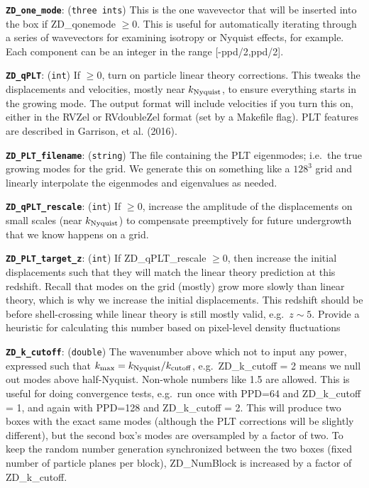 \documentclass[11pt,preprint]{aastex}
\newcommand{\param}[2]{\medskip\noindent\textbf{\texttt{#1}}: ({\tt #2}) }
\newcommand{\todo}{}
\newcommand{\todo}[1]{{\bf TODO: #1}}
\begin{document}
\param{ZD\_one\_mode}{three ints} This is the one wavevector that will be inserted into the box if ZD\_qonemode $\ge0$.
This is useful for automatically iterating through a series of wavevectors for examining isotropy or Nyquist effects, for example.
Each component can be an integer in the range [-ppd/2,ppd/2].

\param{ZD\_qPLT}{int} If $\ge0$, turn on particle linear theory corrections.
This tweaks the displacements and velocities, mostly near $k_{\rm Nyquist}$, to ensure everything starts in the growing mode.
The output format will include velocities if you turn this on, either in the RVZel or RVdoubleZel format (set by a Makefile flag).
PLT features are described in Garrison, et al. (2016).

\param{ZD\_PLT\_filename}{string} The file containing the PLT eigenmodes; i.e.~the true growing modes for the grid.
We generate this on something like a $128^3$ grid and linearly interpolate the eigenmodes and eigenvalues as needed.

\param{ZD\_qPLT\_rescale}{int} If $\ge0$, increase the amplitude of the displacements on small scales (near $k_{\rm Nyquist}$)
to compensate preemptively for future undergrowth that we know happens on a grid.

\param{ZD\_PLT\_target\_z}{int} If ZD\_qPLT\_rescale $\ge0$, then increase the initial displacements such that they will match the linear theory prediction
at this redshift.  Recall that modes on the grid (mostly) grow more slowly than linear theory, which is why we increase the initial displacements.
This redshift should be before shell-crossing while linear theory is still mostly valid, e.g.~$z\sim 5$.
\todo{Provide a heuristic for calculating this number based on pixel-level density fluctuations}

\param{ZD\_k\_cutoff}{double} The wavenumber above which not to input any power, expressed such that $k_{\rm max} = k_{\rm Nyquist} / k_{\rm cutoff}$, e.g.~ZD\_k\_cutoff = 2 means we null out modes above half-Nyquist.  Non-whole numbers like 1.5 are allowed.  This is useful for doing convergence tests, e.g.~run once with PPD=64 and ZD\_k\_cutoff = 1, and again with PPD=128 and ZD\_k\_cutoff = 2.  This will produce two boxes with the exact same modes (although the PLT corrections will be slightly different), but the second box's modes are oversampled by a factor of two.  To keep the random number generation synchronized between the two boxes (fixed number of particle planes per block), ZD\_NumBlock is increased by a factor of ZD\_k\_cutoff.
\end{document}
